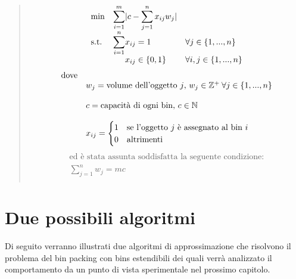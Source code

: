 \begin{quote}	
	\begin{equation*}
		\begin{array}{ll@{}ll}
			\text{min}  & \displaystyle\sum\limits_{i=1}^{m} & |c - \displaystyle\sum\limits_{j=1}^{n} x_{ij}w_j|   & \\
			\text{s.t.} & \displaystyle\sum\limits_{i=1}^{n} & x_{ij} = 1 			  								& \forall j \in \{1, ..., n\} \\ 
		                & 								     														& x_{ij} \in \{0,1\}  	  & \forall i, j \in \{1, ..., n\} \\
		\end{array}
	\end{equation*}
	\begin{equation*}
		\begin{array}{ll@{}ll}
	    	\text{dove} &																									   & \\
	    				& w_j = \text{volume dell'oggetto } j	\text{, } w_j \in \mathbb{Z}^+ \: \forall j \in \{1, ..., n\}  & \\ \\
		    			& c = \text{capacità di ogni bin, } c \in \mathbb{N} 												   & \\ \\
						& x_{ij} = 
							\begin{cases}
    							1 & \text{se l'oggetto } j \text{ è assegnato al bin } i \\
    							0 & \text{altrimenti}
							\end{cases}					    																   & \\
		\end{array}
	\end{equation*}
	\begin{equation*}
		\begin{array}{c}
			\text{ed è stata assunta soddisfatta la seguente condizione:} \\
			\displaystyle\sum\limits_{j=1}^{n} w_j = mc					 \\								  
		\end{array}
	\end{equation*}
\end{quote}


\section{Due possibili algoritmi}
Di seguito verranno illustrati due algoritmi di approssimazione che risolvono il problema del bin packing con bins estendibili 
dei quali verrà analizzato il comportamento da un punto di vista sperimentale nel prossimo capitolo.


